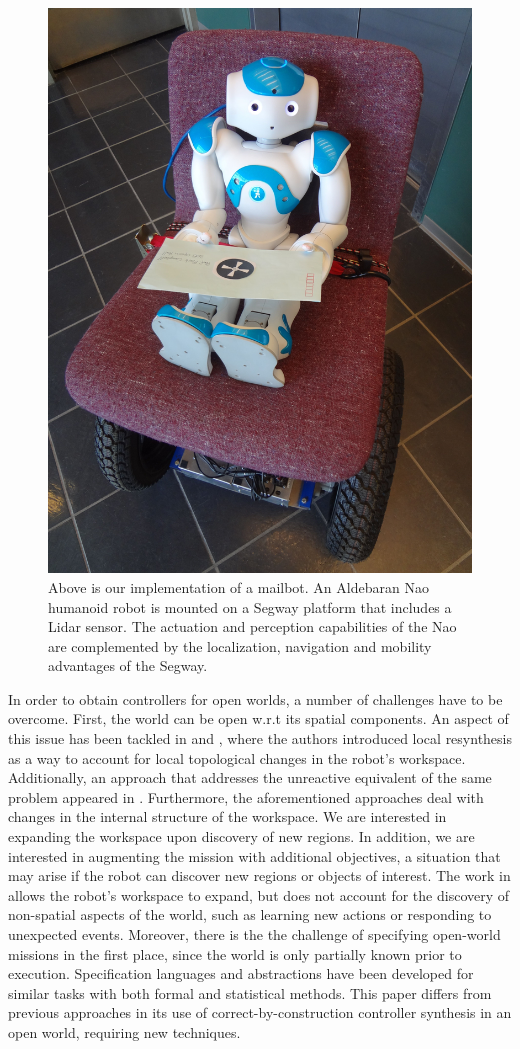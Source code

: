 \begin{figure}[t]
	\centering
	\includegraphics[width=0.7\columnwidth, clip]{./img/mailbot.jpg}
	\caption{Above is our implementation of a mailbot. An Aldebaran Nao humanoid robot is mounted on a Segway platform that includes a Lidar sensor. The actuation and perception capabilities of the Nao are complemented by the localization, navigation and mobility advantages of the Segway.}
	\label{Fig:mailbot}
\end{figure}

In order to obtain controllers for open worlds, a number of challenges have to be overcome. 
First, the world can be open w.r.t its spatial components. An aspect of this issue has been tackled in \cite{MurrayICRA2012} and \cite{MurrayICRA2013a}, where the authors introduced local resynthesis as a way to account for local topological changes in the robot's workspace. 
Additionally, an approach that addresses the unreactive equivalent of the same problem appeared in \cite{Dimos2013ICRA}. 
Furthermore, the aforementioned approaches deal with changes in the internal structure of the workspace. We are interested in expanding the workspace upon discovery of new regions.
In addition, we are interested in augmenting the mission with additional objectives, a situation that may arise if the robot can discover new regions or objects of interest. 
The work in \cite{BingxinRSS2012} allows the robot's workspace to expand, but does not account for the discovery of non-spatial aspects of the world, such as learning new actions or responding to unexpected events.
Moreover, there is the the challenge of specifying open-world missions in the first place, since the world is only partially known prior to execution. 
Specification languages and abstractions have been developed for similar tasks with both formal \cite{Joshi2012, MatthiasAI2010} and statistical \cite{Tellex2011} methods.
This paper differs from previous approaches in its use of correct-by-construction controller synthesis in an open world, requiring new techniques.

